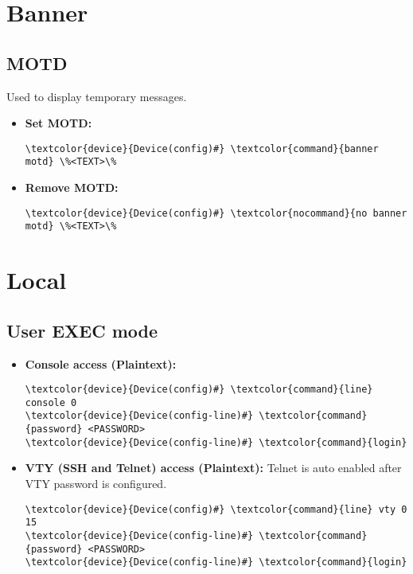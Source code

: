 \documentclass[10pt, a4paper, onecolumn, oneside, titlepage, openany]{book}
\begin{document}
\section{Banner}
\subsection{MOTD}
Used to display temporary messages.
\begin{itemize}
    \item \textbf{Set MOTD:}
\begin{Verbatim}[commandchars=\\\{\}]
\textcolor{device}{Device(config)#} \textcolor{command}{banner motd} \%<TEXT>\%
\end{Verbatim}
    \item \textbf{Remove MOTD:}
\begin{Verbatim}[commandchars=\\\{\}]
\textcolor{device}{Device(config)#} \textcolor{nocommand}{no banner motd} \%<TEXT>\%
\end{Verbatim}
\end{itemize}

\section{Local}
\subsection{User EXEC mode}
\begin{itemize}
    \item \textbf{Console access (Plaintext):}
\begin{Verbatim}[commandchars=\\\{\}]
\textcolor{device}{Device(config)#} \textcolor{command}{line} console 0
\textcolor{device}{Device(config-line)#} \textcolor{command}{password} <PASSWORD>
\textcolor{device}{Device(config-line)#} \textcolor{command}{login}
\end{Verbatim}
    \item \textbf{VTY (SSH and Telnet) access (Plaintext):}
    \newline Telnet is auto enabled after VTY password is configured.
\begin{Verbatim}[commandchars=\\\{\}]
\textcolor{device}{Device(config)#} \textcolor{command}{line} vty 0 15
\textcolor{device}{Device(config-line)#} \textcolor{command}{password} <PASSWORD>
\textcolor{device}{Device(config-line)#} \textcolor{command}{login}
\end{Verbatim}
\end{itemize}
\end{document}
